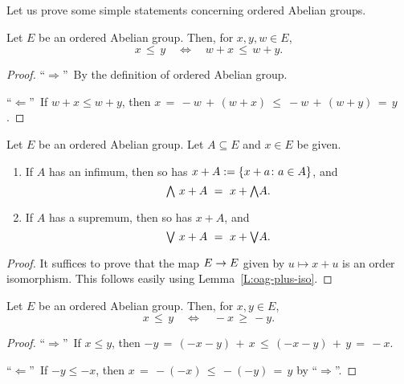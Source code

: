 \noindent
Let us prove some simple statements
concerning ordered Abelian groups.
%
%
\begin{lem}
\label{L:oag-plus-iso}
Let $E$ be an ordered Abelian group.
Then, for $x,y,w\in E$,
\begin{equation*}
x \,\leq\, y \quad\iff\quad w+x \,\leq\, w+y.
\end{equation*}
\end{lem}
\begin{proof}
``$\Longrightarrow$''\ 
By the definition of ordered Abelian group.

\noindent ``$\Longleftarrow$''\ 
If $w+x\leq w+y$, then $x \,=\,-w\,+\, (w+x) \ \leq\ 
-w\,+\,(w+y) \,=\, y$.
\end{proof}
%
%
\begin{lem}
\label{L:oag-plus-preserves}
Let $E$ be an ordered Abelian group.
Let $A\subseteq E$ and $x\in E$ be given.
\begin{enumerate}
\item \label{L:oag-plus-preserves-meet}
If $A$ has an infimum,
then so has $x+A := \{ x+a\colon a\in A\}$,
and 
\begin{equation*}
\textstyle{\bigwedge} \,\,x+A \ =\  x+\textstyle{\bigwedge} A.
\end{equation*}
\item \label{L:oag-plus-preserves-join}
If $A$ has a supremum,
then so has $x+A$,
and 
\begin{equation*}
\textstyle{\bigvee} \,\,x+A \ =\  x+\textstyle{\bigvee} A.
\end{equation*}
\end{enumerate}
\end{lem}
\begin{proof}
It suffices to prove that the map $E\rightarrow E$
given by $u\mapsto x + u$ is an order isomorphism.
This follows easily using Lemma~\ref{L:oag-plus-iso}.
\end{proof}
%
%
\begin{lem}
\label{L:oag-minus-iso}
Let $E$ be an ordered Abelian group.
Then, for $x,y\in E$,
\begin{equation*}
x \,\leq\, y \quad\iff\quad -x \,\geq\, -y.
\end{equation*}
\end{lem}
\begin{proof}
``$\Longrightarrow$''\ 
If $x\leq y$, then
$-y \,=\, (-x-y)\,+\,x
\,\leq\, (-x-y)\,+\, y
\,=\, -x$.

\noindent ``$\Longleftarrow$''\ 
If $-y \leq -x$,
then $x\,=\,-(-x) \,\leq\, -(-y) \,=\, y$
by ``$\Longrightarrow$''.
\end{proof}
